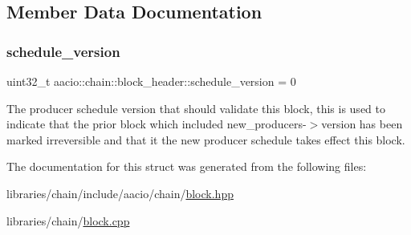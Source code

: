 \subsection{Member Data Documentation}
\mbox{\label{structaacio_1_1chain_1_1block__header_a46ae9f2aef0525817b975e5d4a175026}} 
\subsubsection{\texorpdfstring{schedule\+\_\+version}{schedule\_version}}
{\footnotesize\ttfamily uint32\+\_\+t aacio\+::chain\+::block\+\_\+header\+::schedule\+\_\+version = 0}

The producer schedule version that should validate this block, this is used to indicate that the prior block which included new\+\_\+producers-\/$>$version has been marked irreversible and that it the new producer schedule takes effect this block. 

The documentation for this struct was generated from the following files\+:\begin{DoxyCompactItemize}
\item 
libraries/chain/include/aacio/chain/\mbox{\hyperlink{block_8hpp}{block.\+hpp}}\item 
libraries/chain/\mbox{\hyperlink{block_8cpp}{block.\+cpp}}\end{DoxyCompactItemize}
